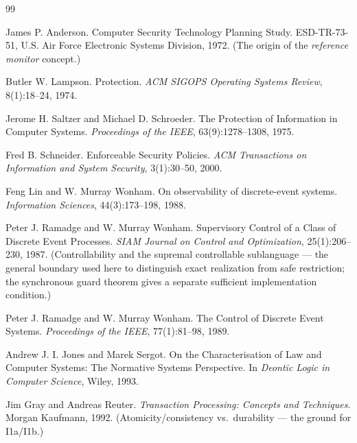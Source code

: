 \documentclass[11pt,a4paper]{article}
\theoremstyle{definition}
\theoremstyle{remark}
\begin{document}

\pdprintsolutions
\begin{thebibliography}{99}

James P. Anderson.
\newblock Computer Security Technology Planning Study.
\newblock ESD-TR-73-51, U.S. Air Force Electronic Systems Division, 1972.
\newblock (The origin of the \emph{reference monitor} concept.)

Butler W. Lampson.
\newblock Protection.
\newblock \textit{ACM SIGOPS Operating Systems Review}, 8(1):18--24, 1974.

Jerome H. Saltzer and Michael D. Schroeder.
\newblock The Protection of Information in Computer Systems.
\newblock \textit{Proceedings of the IEEE}, 63(9):1278--1308, 1975.

Fred B. Schneider.
\newblock Enforceable Security Policies.
\newblock \textit{ACM Transactions on Information and System Security}, 3(1):30--50, 2000.

Feng Lin and W. Murray Wonham.
\newblock On observability of discrete-event systems.
\newblock \textit{Information Sciences}, 44(3):173--198, 1988.

Peter J. Ramadge and W. Murray Wonham.
\newblock Supervisory Control of a Class of Discrete Event Processes.
\newblock \textit{SIAM Journal on Control and Optimization}, 25(1):206--230, 1987.
\newblock (Controllability and the supremal controllable sublanguage --- the general
boundary used here to distinguish exact realization from safe restriction;
the synchronous guard theorem gives a separate sufficient implementation condition.)

Peter J. Ramadge and W. Murray Wonham.
\newblock The Control of Discrete Event Systems.
\newblock \textit{Proceedings of the IEEE}, 77(1):81--98, 1989.

Andrew J. I. Jones and Marek Sergot.
\newblock On the Characterisation of Law and Computer Systems: The Normative Systems Perspective.
\newblock In \textit{Deontic Logic in Computer Science}, Wiley, 1993.

Jim Gray and Andreas Reuter.
\newblock \textit{Transaction Processing: Concepts and Techniques}.
\newblock Morgan Kaufmann, 1992.
\newblock (Atomicity/consistency vs.\ durability --- the ground for I1a/I1b.)


\end{thebibliography}
\end{document}

